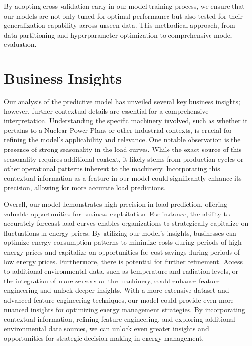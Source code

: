 \documentclass{article} %
\begin{document}
By adopting cross-validation early in our model training process, we ensure that our models are not only tuned for optimal performance but also tested for their generalization capability across unseen data. This methodical approach, from data partitioning and hyperparameter optimization to comprehensive model evaluation. 

\section{Business Insights}
Our analysis of the predictive model has unveiled several key business insights; however, further contextual details are essential for a comprehensive interpretation. Understanding the specific machinery involved, such as whether it pertains to a Nuclear Power Plant or other industrial contexts, is crucial for refining the model's applicability and relevance. One notable observation is the presence of strong seasonality in the load curves. While the exact source of this seasonality requires additional context, it likely stems from production cycles or other operational patterns inherent to the machinery. Incorporating this contextual information as a feature in our model could significantly enhance its precision, allowing for more accurate load predictions.

Overall, our model demonstrates high precision in load prediction, offering valuable opportunities for business exploitation. For instance, the ability to accurately forecast load curves enables organizations to strategically capitalize on fluctuations in energy prices. By utilizing our model's insights, businesses can optimize energy consumption patterns to minimize costs during periods of high energy prices and capitalize on opportunities for cost savings during periods of low energy prices. Furthermore, there is potential for further refinement. Access to additional environmental data, such as temperature and radiation levels, or the integration of more sensors on the machinery, could enhance feature engineering and unlock deeper insights. With a more extensive dataset and advanced feature engineering techniques, our model could provide even more nuanced insights for optimizing energy management strategies. By incorporating contextual information, refining feature engineering, and exploring additional environmental data sources, we can unlock even greater insights and opportunities for strategic decision-making in energy management.
\end{document}

